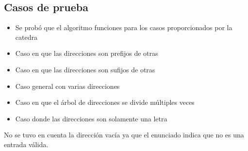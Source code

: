 \subsection{Casos de prueba}

\begin{itemize}
\item Se probó que el algoritmo funciones para los casos proporcionados por
la catedra
\item Caso en que las direcciones son prefijos de otras
\item Caso en que las direcciones son sufijos de otras
\item Caso general con varias direcciones
\item Caso en que el árbol de direcciones se divide múltiples veces
\item Caso donde las direcciones son solamente una letra
\end{itemize}

No se tuvo en cuenta la dirección vacía ya que el enunciado indica que no es
una entrada válida.